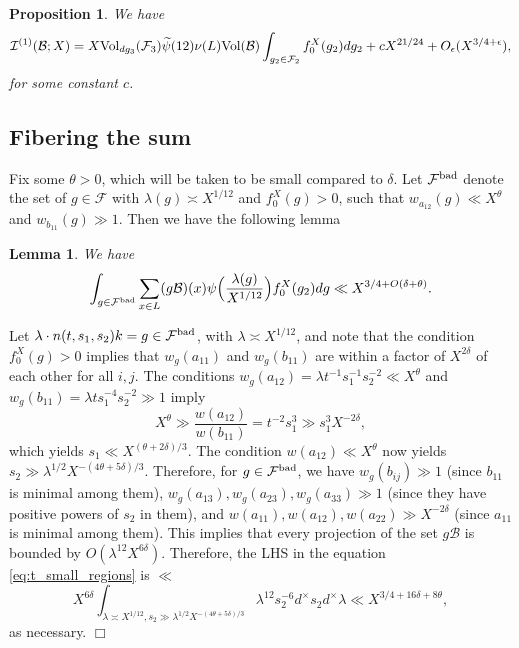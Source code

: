 \documentclass{article}
\def\bad{{\rm bad}}
\def\Vol{{\rm Vol}}
\def\cB{{\mathcal B}}
\def\FF{{\mathcal F}}
\def\I{{\mathcal I}}
\def\wt{\widetilde}
\newtheorem{lemma}[theorem]{Lemma}
\newtheorem{proposition}[theorem]{Proposition}
\newenvironment{proof}{\noindent {\bf Proof:}}{$\Box$ \vspace{2 ex}}
\begin{document}
\begin{proposition}\label{prop:tsmallpowerexpansion}
We have
$$\I^{(1)}(\cB;X)=X\Vol_{dg_3}(\FF_3)\wt{\psi}(12)\nu(L)\Vol(\cB)\int_{g_2\in\FF_2}f_0^X(g_2)dg_2+cX^{21/24}+O_{\epsilon}(X^{3/4+\epsilon}),$$    
for some constant $c$.
\end{proposition}



\subsection{Fibering the sum}


Fix some $\theta>0$, which will be taken to be small compared to $\delta$. Let $\FF^\bad$ denote the set of $g\in\FF$ with $\lambda(g)\asymp X^{1/12}$ and $f_0^X(g)>0$, such that $w_{a_{12}}(g)\ll X^\theta$ and $w_{b_{11}}(g)\gg 1$.
Then we have the following lemma
\begin{lemma}\label{lem:t_small_regions}
We have
\begin{equation}\label{eq:t_small_regions}
\int_{g\in\FF^\bad}\sum_{x\in L} (g\cB)(x)\psi\Big(\frac{\lambda(g)}{X^{1/12}}\Big)f_0^X(g_2)dg\ll X^{3/4+O(\delta+\theta)}.
\end{equation}
\end{lemma}
\begin{proof}
Let $\lambda\cdot n(t,s_1,s_2)k=g\in\FF^\bad$, with $\lambda\asymp X^{1/12}$, and note that the condition $f_0^X(g)>0$ implies that $w_g(a_{11})$ and $w_g(b_{11})$ are within a factor of $X^{2\delta}$ of each other for all $i,j$. The conditions
$w_g(a_{12})=\lambda t^{-1}s_1^{-1}s_2^{-2}\ll X^\theta$ and $w_g(b_{11})=\lambda t s_1^{-4}s_2^{-2}\gg 1$ imply
\begin{equation*}
X^\theta\gg \frac{w(a_{12})}{w(b_{11})}=t^{-2}s_1^{3}\gg s_1^3X^{-2\delta},
\end{equation*}
which yields $s_1\ll X^{(\theta+2\delta)/3}$. The condition $w(a_{12})\ll X^\theta$ now yields $s_2\gg \lambda^{1/2} X^{-(4\theta+5\delta)/3}$.
Therefore, for $g\in\FF^\bad$, we have $w_g(b_{ij})\gg 1$ (since $b_{11}$ is minimal among them), $w_g(a_{13}),w_g(a_{23}),w_g(a_{33})\gg 1$ (since they have positive powers of $s_2$ in them), and $w(a_{11}),w(a_{12}),w(a_{22})\gg X^{-2\delta}$ (since $a_{11}$ is minimal among them). This implies that every projection of the set $g\cB$ is bounded by $O(\lambda^{12}X^{6\delta})$.
Therefore, the LHS in the equation \eqref{eq:t_small_regions} is $\ll$
\begin{equation*}
X^{6\delta}\int_{\lambda\asymp X^{1/12},s_2\gg \lambda^{1/2}X^{-(4\theta+5\delta)/3}}\lambda^{12}s_2^{-6}d^\times s_2d^\times\lambda
\ll X^{3/4+16\delta+8\theta},
\end{equation*}
as necessary.
\end{proof}
\end{document}
